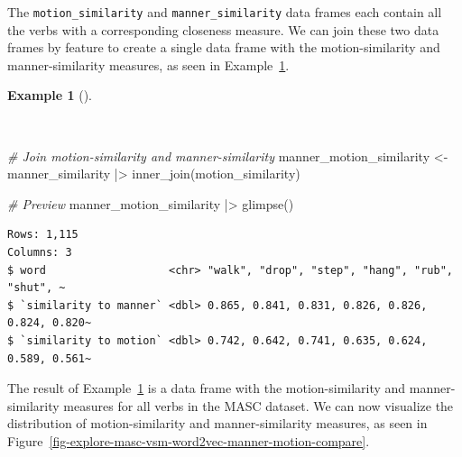 \documentclass[
  letterpaper,
]{latex/krantz}
\newenvironment{Shaded}{\begin{snugshade}}{\end{snugshade}}
\newcommand{\CommentTok}[1]{\textcolor[rgb]{0.00,0.00,0.00}{\textit{#1}}}
\newcommand{\FunctionTok}[1]{\textcolor[rgb]{0.00,0.00,0.00}{#1}}
\newcommand{\NormalTok}[1]{\textcolor[rgb]{0.00,0.00,0.00}{#1}}
\newcommand{\OtherTok}[1]{\textcolor[rgb]{0.00,0.00,0.00}{#1}}
\newcommand{\SpecialCharTok}[1]{\textcolor[rgb]{0.00,0.00,0.00}{#1}}
\theoremstyle{definition}
\newtheorem{example}{Example}[chapter]
\theoremstyle{remark}
\begin{document}
The \texttt{motion\_similarity} and \texttt{manner\_similarity} data
frames each contain all the verbs with a corresponding closeness
measure. We can join these two data frames by feature to create a single
data frame with the motion-similarity and manner-similarity measures, as
seen in Example~\ref{exm-explore-masc-vsm-word2vec-manner-motion}.

\begin{example}[]\protect\hypertarget{exm-explore-masc-vsm-word2vec-manner-motion}{}\label{exm-explore-masc-vsm-word2vec-manner-motion}

~

\begin{Shaded}
\begin{Highlighting}[]
\CommentTok{\# Join motion{-}similarity and manner{-}similarity}
\NormalTok{manner\_motion\_similarity }\OtherTok{\textless{}{-}}
\NormalTok{  manner\_similarity }\SpecialCharTok{|\textgreater{}}
  \FunctionTok{inner\_join}\NormalTok{(motion\_similarity)}

\CommentTok{\# Preview}
\NormalTok{manner\_motion\_similarity }\SpecialCharTok{|\textgreater{}} \FunctionTok{glimpse}\NormalTok{()}
\end{Highlighting}
\end{Shaded}

\begin{verbatim}
Rows: 1,115
Columns: 3
$ word                   <chr> "walk", "drop", "step", "hang", "rub", "shut", ~
$ `similarity to manner` <dbl> 0.865, 0.841, 0.831, 0.826, 0.826, 0.824, 0.820~
$ `similarity to motion` <dbl> 0.742, 0.642, 0.741, 0.635, 0.624, 0.589, 0.561~
\end{verbatim}

\end{example}

The result of Example~\ref{exm-explore-masc-vsm-word2vec-manner-motion}
is a data frame with the motion-similarity and manner-similarity
measures for all verbs in the MASC dataset. We can now visualize the
distribution of motion-similarity and manner-similarity measures, as
seen in
Figure~\ref{fig-explore-masc-vsm-word2vec-manner-motion-compare}.
\end{document}
